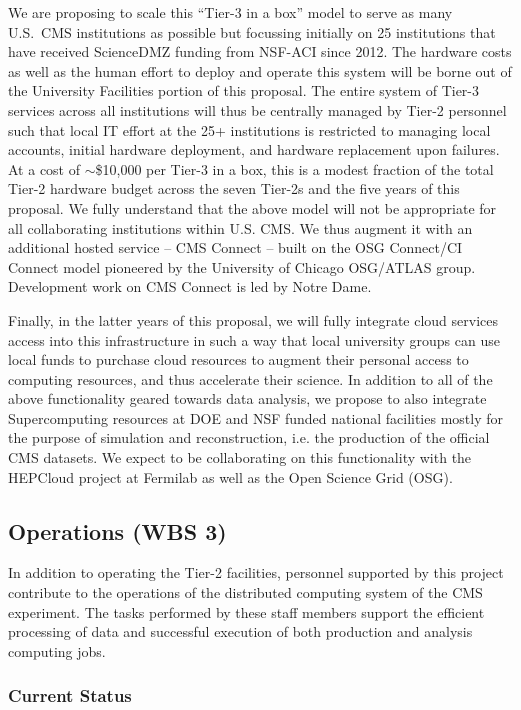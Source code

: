 \documentclass[11pt,a4paper]{article}
\begin{document}
We are proposing to scale this ``Tier-3 in a box'' model to serve
as many U.S.~CMS institutions as possible but focussing initially on 25 institutions 
that have received ScienceDMZ funding from NSF-ACI
since 2012. The hardware costs as well as the human effort to deploy and
operate this system will be borne out of the University Facilities portion
of this proposal.  The entire system of Tier-3 services across all institutions
will thus be centrally managed by Tier-2 personnel such that local IT effort at the 25+ institutions
is restricted to managing local accounts, initial hardware deployment, and hardware replacement
upon failures.
At a cost of $\sim$\$10,000 per Tier-3 in a box, this is
a modest fraction of the total Tier-2 hardware budget across the seven
Tier-2s and the five years of this proposal.  We fully understand that the
above model will not be appropriate for all collaborating institutions
within U.S. CMS. We thus augment it with an additional hosted service -- CMS
Connect -- built on the OSG Connect/CI Connect model pioneered by the
University of Chicago OSG/ATLAS group.  Development work on CMS Connect is
led by Notre Dame.

Finally, in the latter years of this proposal, we will fully integrate cloud services access into this
infrastructure in such a way that local university groups can use local
funds to purchase cloud resources to augment their personal access to
computing resources, and thus accelerate their science. 
In addition to all of the above functionality geared towards data
analysis, we propose to also integrate Supercomputing resources at DOE
and NSF funded national facilities mostly for the purpose of
simulation and reconstruction, i.e. the production of the official CMS
datasets.  We expect to be collaborating on this functionality with the HEPCloud project at
Fermilab as well as the Open Science Grid (OSG).

\subsection{Operations (WBS 3)}

In addition to operating the Tier-2 facilities, personnel supported by this
project contribute to the operations of the distributed computing system of
the CMS experiment.  The tasks performed by these staff members support the
efficient processing of data and successful execution of both production
and analysis computing jobs.

\subsubsection{Current Status}
\end{document}
